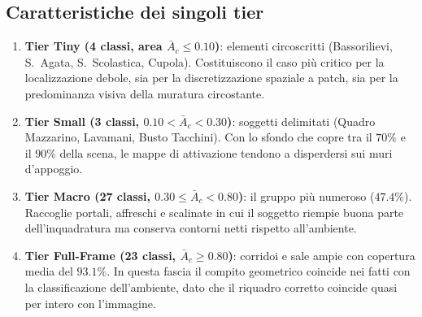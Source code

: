 \subsection{Caratteristiche dei singoli tier}
\begin{enumerate}
    \item \textbf{Tier Tiny (4 classi, area $\bar{A}_c \le 0.10$)}: elementi circoscritti (Bassorilievi, S.~Agata, S.~Scolastica, Cupola). Costituiscono il caso più critico per la localizzazione debole, sia per la discretizzazione spaziale a patch, sia per la predominanza visiva della muratura circostante.
    \item \textbf{Tier Small (3 classi, $0.10 < \bar{A}_c < 0.30$)}: soggetti delimitati (Quadro Mazzarino, Lavamani, Busto Tacchini). Con lo sfondo che copre tra il $70\%$ e il $90\%$ della scena, le mappe di attivazione tendono a disperdersi sui muri d'appoggio.
    \item \textbf{Tier Macro (27 classi, $0.30 \le \bar{A}_c < 0.80$)}: il gruppo più numeroso ($47.4\%$). Raccoglie portali, affreschi e scalinate in cui il soggetto riempie buona parte dell'inquadratura ma conserva contorni netti rispetto all'ambiente.
    \item \textbf{Tier Full-Frame (23 classi, $\bar{A}_c \ge 0.80$)}: corridoi e sale ampie con copertura media del $93.1\%$. In questa fascia il compito geometrico coincide nei fatti con la classificazione dell'ambiente, dato che il riquadro corretto coincide quasi per intero con l'immagine.
\end{enumerate}

